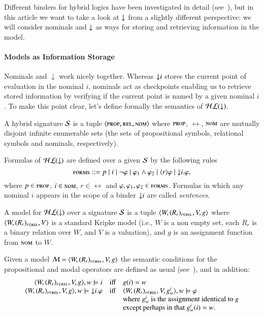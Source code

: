 Different binders for hybrid logics have been investigated in detail
(see~\cite{BS95}), but in this article we want to take a look at
${\downarrow}$ from a slightly different perspective: we will consider
nominals and ${\downarrow}$ as ways for storing and retrieving information
in the model.



\paragraph{Models as Information Storage}
Nominals and $\downarrow$ work nicely together.
Whereas ${\downarrow} i$ stores the current point of evaluation in the
nominal $i$, nominals act as checkpoints enabling us to retrieve
stored information by verifying if the current point is named by a
given nominal $i$.  To make this point clear, let's define formally
the semantics of $\mathcal{HL}({\downarrow})$.

\begin{defn} A hybrid signature $\mathcal{S}$ is a tuple $\langle \textsc{prop},\textsc{rel},\textsc{nom} \rangle$
where $\textsc{prop}$, $\rel$, $\textsc{nom}$ are mutually disjoint infinite
enumerable sets (the sets of propositional symbols, relational
symbols and nominals, respectively).

Formulas of $\mathcal{HL}({\downarrow})$ are defined over a given $\mathcal{S}$ by the
following rules
$$
\textsc{forms} ::= p \mid i \mid \lnot \varphi \mid \varphi_1 \land
\varphi_2 \mid \langle r \rangle \varphi \mid {\downarrow} i. \varphi,
$$
where $p \in \textsc{prop}$, $i \in \textsc{nom}$,  $r \in \rel$  and $\varphi,
\varphi_1, \varphi_2 \in \textsc{forms}$. Formulas in which any nominal $i$
appears in the scope of a binder ${\downarrow} i$ are called
\emph{sentences}.

A model for $\mathcal{HL}({\downarrow})$ over a signature $\mathcal{S}$ is a tuple
$\langle W,(R_r)_{r \in \textsc{rel}},V,g \rangle$ where $\langle W,(R_r)_{r \in \textsc{rel}},V \rangle$ is a standard Kripke
model (i.e., $W$ is a non empty set, each $R_r$ is a binary relation
over $W$, and $V$ is a valuation), and $g$ is an assignment function
from $\textsc{nom}$ to $W$.

Given a model $\mathcal{M} = \langle W,(R_r)_{r \in \textsc{rel}},V,g \rangle$ the semantic conditions
for the propositional and modal operators are defined as usual
(see~\cite{BRV01}), and in addition:
$$
\begin{array}{rcl}
\langle W,(R_r)_{r \in \textsc{rel}},V,g \rangle, w \models  i & \mbox{iff} & g(i) = w\\
\langle W,(R_r)_{r \in \textsc{rel}},V,g \rangle, w \models {\downarrow} i.\varphi & \mbox{iff} &
  \langle W,(R_r)_{r \in \textsc{rel}},V,g^i_w \rangle, w \models \varphi\\
& & \mbox{where $g^i_w$ is the assignment identical to $g$}\\
& & \mbox{except perhaps in that $g^i_w(i)=w$}.
\end{array}
$$
\end{defn}

